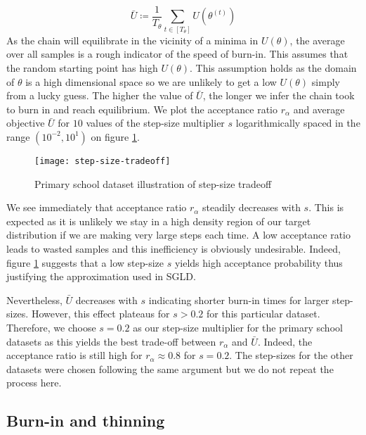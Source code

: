 %
\begin{equation}
	\bar{U} \coloneqq \frac{1}{T_\theta} \sum_{t \in [T_\theta]} U\left( \theta^{(t)} \right)
\end{equation}
%
As the chain will equilibrate in the vicinity of a minima in $U(\theta)$, the average over all samples is a rough indicator of the speed of burn-in. This assumes that the random starting point has high $U(\theta)$. This assumption holds as the domain of $\theta$ is a high dimensional space so we are unlikely to get a low $U(\theta)$ simply from a lucky guess. The higher the value of $\bar{U}$, the longer we infer the chain took to burn in and reach equilibrium. We plot the acceptance ratio $r_\alpha$ and average objective $\bar{U}$ for $10$ values of the step-size multiplier $s$ logarithmically spaced in the range $(10^{-2}, 10^1)$ on figure \ref{fig:step-size-tradeoff}.
%
\begin{figure}[!h]
	\centering
	\texttt{[image: step-size-tradeoff]}
	\caption{Primary school dataset \cite{schools} illustration of step-size tradeoff}
	\label{fig:step-size-tradeoff}
\end{figure}

We see immediately that acceptance ratio $r_\alpha$ steadily decreases with $s$. This is expected as it is unlikely we stay in a high density region of our target distribution if we are making very large steps each time. A low acceptance ratio leads to wasted samples and this inefficiency is obviously undesirable. Indeed, figure \ref{fig:step-size-tradeoff} suggests that a low step-size $s$ yields high acceptance probability thus justifying the approximation used in SGLD.

Nevertheless, $\bar{U}$ decreases with $s$ indicating shorter burn-in times for larger step-sizes. However, this effect plateaus for $s>0.2$ for this particular dataset. Therefore, we choose $s=0.2$ as our step-size multiplier for the primary school datasets as this yields the best trade-off between $r_\alpha$ and $\bar{U}$. Indeed, the acceptance ratio is still high for $r_\alpha \approx 0.8$ for $s=0.2$. The step-sizes for the other datasets were chosen following the same argument but we do not repeat the process here.

\FloatBarrier
\subsection{Burn-in and thinning}
\label{appdx:burn-in-thinning}

